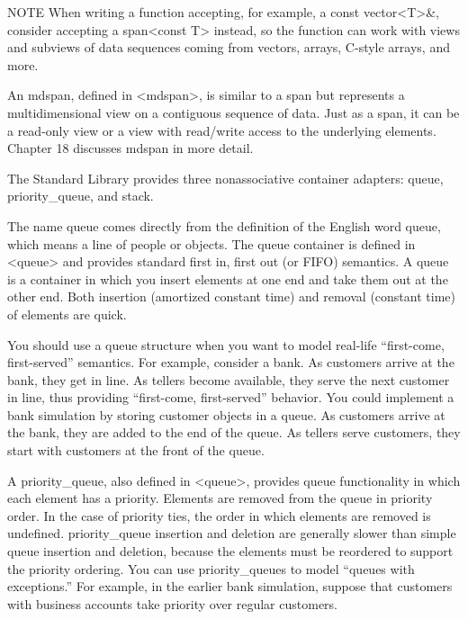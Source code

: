 \begin{myNotic}{NOTE}
When writing a function accepting, for example, a const vector<T>\&, consider accepting a span<const T> instead, so the function can work with views and subviews of data sequences coming from vectors, arrays, C-style arrays, and more.
\end{myNotic}



An mdspan, defined in <mdspan>, is similar to a span but represents a multidimensional view on a contiguous sequence of data. Just as a span, it can be a read-only view or a view with read/write access to the underlying elements. Chapter 18 discusses mdspan in more detail.



The Standard Library provides three nonassociative container adapters: queue, priority\_queue, and stack.


The name queue comes directly from the definition of the English word queue, which means a line of people or objects. The queue container is defined in <queue> and provides standard first in, first out (or FIFO) semantics. A queue is a container in which you insert elements at one end and take them out at the other end. Both insertion (amortized constant time) and removal (constant time) of elements are quick.

You should use a queue structure when you want to model real-life “first-come, first-served” semantics. For example, consider a bank. As customers arrive at the bank, they get in line. As tellers become available, they serve the next customer in line, thus providing “first-come, first-served” behavior. You could implement a bank simulation by storing customer objects in a queue. As customers arrive at the bank, they are added to the end of the queue. As tellers serve customers, they start with customers at the front of the queue.


A priority\_queue, also defined in <queue>, provides queue functionality in which each element has a priority. Elements are removed from the queue in priority order. In the case of priority ties, the order in which elements are removed is undefined. priority\_queue insertion and deletion are generally slower than simple queue insertion and deletion, because the elements must be reordered to support the priority ordering. You can use priority\_queues to model “queues with exceptions.” For example, in the earlier bank simulation, suppose that customers with business accounts take priority over regular customers.

